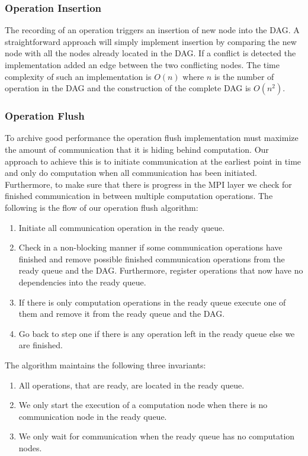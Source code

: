 \documentclass[preprint]{../PGAS10/sigplanconf}
\begin{document}
\subsubsection{Operation Insertion}
The recording of an operation triggers an insertion of new node into the DAG. A straightforward approach will simply implement insertion by comparing the new node with all the nodes already located in the DAG. If a conflict is detected the implementation added an edge between the two conflicting nodes. The time complexity of such an implementation is $O(n)$ where $n$ is the number of operation in the DAG and the construction of the complete DAG is $O(n^2)$.


\subsubsection{Operation Flush}
To archive good performance the operation flush implementation must maximize the amount of communication that it is hiding behind computation. Our approach to achieve this is to initiate communication at the earliest point in time and only do computation when all communication has been initiated. Furthermore, to make sure that there is progress in the MPI layer we check for finished communication in between multiple computation operations. The following is the flow of our operation flush algorithm:
\begin{enumerate}
\item Initiate all communication operation in the ready queue.
\item Check in a non-blocking manner if some communication operations have finished and remove possible finished communication operations from the ready queue and the DAG. Furthermore, register operations that now have no dependencies into the ready queue.
\item If there is only computation operations in the ready queue execute one of them and remove it from the ready queue and the DAG.
\item Go back to step one if there is any operation left in the ready queue else we are finished.
\end{enumerate}
The algorithm maintains the following three invariants:
\begin{enumerate}
\item All operations, that are ready, are located in the ready queue.
\item We only start the execution of a computation node when there is no communication node in the ready queue.
\item We only wait for communication when the ready queue has no computation nodes.
\end{enumerate}
\end{document}
